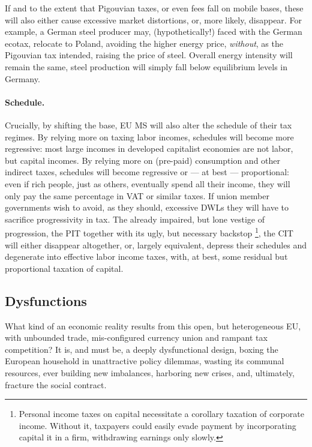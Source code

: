 \documentclass[11pt,a4paper,oneside]{article}
\begin{document}
If and to the extent that Pigouvian taxes, or even fees fall on mobile bases, these will also either cause excessive market distortions, or, more likely, disappear. 
For example, a German steel producer may, (hypothetically!) faced with the German ecotax, relocate to Poland, avoiding the higher energy price, \emph{without}, as the Pigouvian tax intended, raising the price of steel. 
Overall energy intensity will remain the same, steel production will simply fall below equilibrium levels in Germany.

\paragraph{Schedule.} 
Crucially, by shifting the base, \gls{EU} \gls{MS} will also alter the schedule of their tax regimes. 
By relying more on taxing labor incomes, schedules will become more regressive: 
most large incomes in developed capitalist economies are not labor, but capital incomes. 
By relying more on (pre-paid) consumption and other indirect taxes, schedules will become regressive or --- at best --- proportional: 
even if rich people, just as others, eventually spend all their income, they will only pay the same percentage in \gls{VAT} or similar taxes. 
If union member governments wish to avoid, as they should, excessive \glspl{DWL} they will have to sacrifice progressivity in tax. 
The already impaired, but lone vestige of progression, the \gls{PIT} together with its ugly, but necessary backstop
\footnote{
	Personal income taxes on capital necessitate a corollary taxation of corporate income. 
	Without it, taxpayers could easily evade payment by incorporating capital it in a firm, withdrawing earnings only slowly.
}, 
the \gls{CIT} will either disappear altogether, or, largely equivalent, depress their schedules and degenerate into effective labor income taxes, with, at best, some residual but proportional taxation of capital.

\subsection{Dysfunctions} \label{sec:defunct} 
What kind of an economic reality results from this open, but heterogeneous \gls{EU}, with unbounded trade, mis-configured currency union and rampant tax competition? 
It is, and must be, a deeply dysfunctional design, boxing the European household in unattractive policy dilemmas, wasting its communal resources, ever building new imbalances, harboring new crises, and, ultimately, fracture the social contract.
\end{document}
